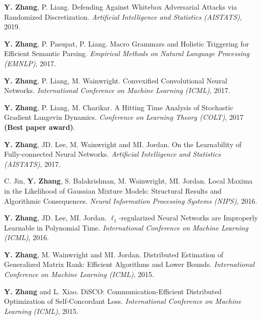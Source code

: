 \documentclass{res}
\begin{document}
\begin{resume}
\begin{enumerate}[label={[C\arabic*]}, ref={C\arabic*}]

\item  \textbf{Y. Zhang}, P. Liang. Defending Against Whitebox Adversarial Attacks via Randomized Discretization.
\emph{Artificial Intelligence and Statistics (AISTATS)}, 2019. \label{defending-aistats17}

\item  \textbf{Y. Zhang}, P. Pasupat, P. Liang. Macro Grammars and Holistic Triggering for Efficient Semantic Parsing.
\emph{Empirical Methods on Natural Language Processing (EMNLP)}, 2017. \label{macro-emnlp17}

\item  \textbf{Y. Zhang}, P. Liang, M. Wainwright. Convexified Convolutional Neural Networks.
\emph{International Conference on Machine Learning (ICML)}, 2017. \label{convexified-icml17}

\item  \textbf{Y. Zhang}, P. Liang, M. Charikar. A Hitting Time Analysis of Stochastic Gradient Langevin Dynamics.
\emph{Conference on Learning Theory (COLT)}, 2017 {\bf (Best paper award)}. \label{a-hitting-colt17}

\item \textbf{Y. Zhang}, JD. Lee, M. Wainwright and MI. Jordan. On the Learnability of Fully-connected Neural Networks.
\emph{Artificial Intelligence and Statistics (AISTATS)}, 2017. \label{on-the-learnability-aistats17}

\item C. Jin, {\bf Y. Zhang}, S. Balakrishnan, M. Wainwright, MI. Jordan.  
Local Maxima in the Likelihood of Gaussian Mixture Models: Structural Results and Algorithmic Consequences.
\emph{Neural Information Processing Systems (NIPS)}, 2016. \label{local-nips16}

\item \textbf{Y. Zhang}, JD. Lee, MI. Jordan. $\ell_1$-regularized Neural Networks are Improperly Learnable in Polynomial Time.
\emph{International Conference on Machine Learning (ICML)}, 2016. \label{l1-icml16}

\item \textbf{Y. Zhang}, M. Wainwright and MI. Jordan. Distributed Estimation of Generalized Matrix Rank: Efficient Algorithms and Lower Bounds.
\emph{International Conference on Machine Learning (ICML)}, 2015. \label{distributed-icml15}

\item \textbf{Y. Zhang} and L. Xiao. DiSCO: Communication-Efficient Distributed Optimization of Self-Concordant Loss.
\emph{International Conference on Machine Learning (ICML)}, 2015. \label{communication-icml15}


\end{enumerate}
\end{resume}
\end{document}
